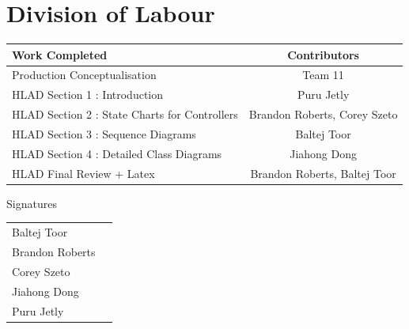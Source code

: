 \documentclass[]{article}
\begin{document}
\newpage
\section{Division of Labour}
\label{sec:division_of_labour}
\begin{center}
\large
			\begin{tabular}{l|c}
				Work Completed   & Contributors \\\hline
				Production Conceptualisation &Team 11 \\
				HLAD Section 1 : Introduction & Puru Jetly \\
				HLAD Section 2 : State Charts for Controllers  & Brandon Roberts, Corey Szeto \\
				HLAD Section 3 : Sequence Diagrams  & Baltej Toor  \\
				HLAD Section 4 : Detailed Class Diagrams & Jiahong Dong \\
				HLAD Final Review + Latex  & Brandon Roberts, Baltej Toor \\
			\end{tabular}
			\vspace{0.1in}
\huge Signatures
\end{center}
			\vspace{0.3in}
\large
			\begin{tabular}{l|r}
			\vspace{1in}
				Baltej Toor  & \underline{\hspace{8cm}} \\
			\vspace{1in}
				Brandon Roberts   & \underline{\hspace{8cm}} \\
			\vspace{1in}
				Corey Szeto  & \underline{\hspace{8cm}} \\
			\vspace{1in}
				Jiahong Dong   & \underline{\hspace{8cm}} \\
			\vspace{1in}
				Puru Jetly   & \underline{\hspace{8cm}} \\
			\end{tabular}
\end{document}
